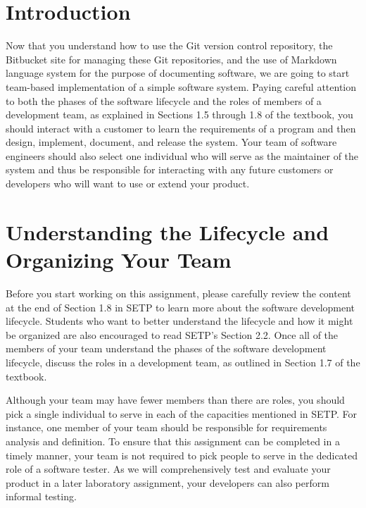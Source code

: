

\usepackage[compact]{titlesec}



\vspace*{-.1in}
\section*{Introduction}

Now that you understand how to use the Git version control repository, the Bitbucket site for managing these Git
repositories, and the use of Markdown language system for the purpose of documenting software, we are going to start
team-based implementation of a simple software system. Paying careful attention to both the phases of the software
lifecycle and the roles of members of a development team, as explained in Sections 1.5 through 1.8 of the textbook, you
should interact with a customer to learn the requirements of a program and then design, implement, document, and release
the system. Your team of software engineers should also select one individual who will serve as the maintainer of the
system and thus be responsible for interacting with any future customers or developers who will want to use or extend
your product.

\section*{Understanding the Lifecycle and Organizing Your Team}

Before you start working on this assignment, please carefully review the content at the end of Section 1.8 in SETP to
learn more about the software development lifecycle. Students who want to better understand the lifecycle and how it
might be organized are also encouraged to read SETP's Section 2.2. Once all of the members of your team understand the
phases of the software development lifecycle, discuss the roles in a development team, as outlined in Section 1.7 of the
textbook.

Although your team may have fewer members than there are roles, you should pick a single individual to serve in each of
the capacities mentioned in SETP. For instance, one member of your team should be responsible for requirements analysis
and definition. To ensure that this assignment can be completed in a timely manner, your team is not required to pick
people to serve in the dedicated role of a software tester. As we will comprehensively test and evaluate your product in a
later laboratory assignment, your developers can also perform informal testing.

